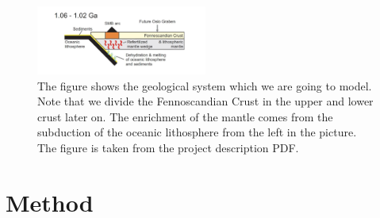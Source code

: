 \documentclass[%
 reprint,
nofootinbib,
aps,
]{revtex4-1}
\begin{document}
\begin{figure}[H]
    \centering
    \includegraphics[width=0.5\textwidth]{figures/geo_fig.png}
    \caption{The figure shows the geological system which we are going to model. Note that we divide the Fennoscandian Crust in the upper and lower crust later on. The enrichment of the mantle comes from the subduction of the oceanic lithosphere from the left in the picture. The figure is taken from the project description PDF.\cite{project_description}}
    \label{fig:geo_fig}
\end{figure}

\section{Method}
\end{document}
